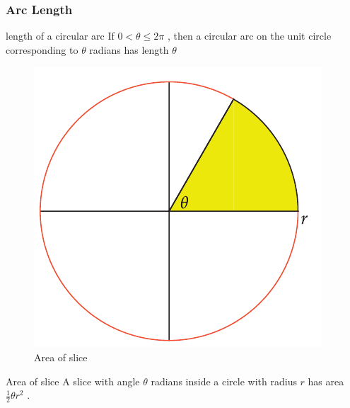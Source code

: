 \documentclass{beamer}
\begin{document}
    \begin{frame}
        \frametitle{Arc Length}
        \begin{block}{length of a circular arc}
            If $0 < \theta \leq 2\pi$ , then a circular arc on the unit circle corresponding to $\theta$ radians
            has length $\theta$         
        \end{block}
    \end{frame}
    
    \begin{frame}
            \begin{figure}[h]    
                \begin{minipage}[b]{0.3\textwidth}
                \centering
                \includegraphics[scale=0.25]{7.png}
                \caption{Area of slice}
            \end{minipage}
        \end{figure}
        \begin{block}{Area of slice}
            A slice with angle $\theta$ radians inside a circle with radius $r$ has area $\frac{1}{2} \theta r^{2}$ .
        \end{block}
    \end{frame}
    
\end{document}
